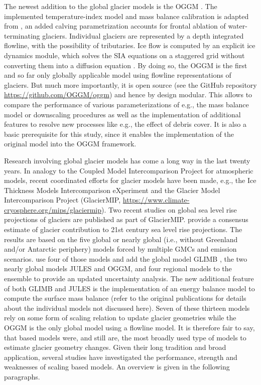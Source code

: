     The newest addition to the global glacier models is the OGGM \citep{Maussion2019}. The implemented temperature-index model and mass balance calibration is adapted from \citet{Marzeion2012b}, an added calving parametrization accounts for frontal ablation of water-terminating glaciers. Individual glaciers are represented by a depth integrated flowline, with the possibility of tributaries. Ice flow is computed by an explicit ice dynamics module, which solves the SIA equations on a staggered grid without converting them into a diffusion equation \citep{Maussion2019}. By doing so, the OGGM is the first and so far only globally applicable model using flowline representations of glaciers. 
    But much more importantly, it is open source (see the GitHub repository \url{https://github.com/OGGM/oggm}) and hence by design modular. This allows to compare the performance of various parameterizations of e.g., the mass balance model or downscaling procedures as well as the implementation of additional features to resolve new processes like e.g., the effect of debris cover. It is also a basic prerequisite for this study, since it enables the implementation of the original \citet{Marzeion2012b} model into the OGGM framework.

    Research involving global glacier models has come a long way in the last twenty years. In analogy to the Coupled Model Intercomparison Project \citep[CMIP, e.g.,][]{Eyring2016_CMIP} for atmospheric models, recent coordinated efforts for glacier models have been made, e.g., the Ice Thickness Models Intercomparison eXperiment \citep[\url{https://cryosphericsciences.org/activities/ice-thickness/}]{Farinotti2017, Farinotti2020} and the Glacier Model Intercomparison Project (GlacierMIP, \url{https://www.climate-cryosphere.org/mips/glaciermip}). Two recent studies on global sea level rise projections of glaciers are published as part of GlacierMIP. \citet{Hock2019a} provide a consensus estimate of glacier contribution to 21st century sea level rise projections. The results are based on the five global or nearly global (i.e., without Greenland and/or Antarctic periphery) models \citep{Slangen2012, Marzeion2012b, Giesen2013, Hirabayashi2013, Radic2014a, Huss2015} forced by multiple GMCs and emission scenarios. \citet{Marzeion2020} use four of those models and add the global model GLIMB \citep{Sakai2017}, the two nearly global models JULES \citep{Shannon2019} and OGGM, and four regional models to the ensemble to provide an updated uncertainty analysis. The new additional feature of both GLIMB and JULES is the implementation of an energy balance model to compute the surface mass balance (refer to the original publications for details about the individual models not discussed here). Seven of these thirteen models rely on some form of scaling relation to update glacier geometries while the OGGM is the only global model using a flowline model. It is therefore fair to say, that \vas{} based models were, and still are, the most broadly used type of models to estimate glacier geometry changes. Given their long tradition and broad application, several studies have investigated the performance, strength and weaknesses of scaling based models. An overview is given in the following paragraphs.

